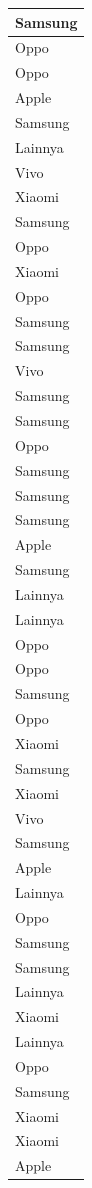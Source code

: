 \documentclass[
  letterpaper,
  DIV=11,
  numbers=noendperiod]{scrartcl}
\begin{document}
\begin{table}
\begin{tabular}[t]{l}
\hline
Samsung\\
\hline
Oppo\\
\hline
Oppo\\
\hline
Apple\\
\hline
Samsung\\
\hline
Lainnya\\
\hline
Vivo\\
\hline
Xiaomi\\
\hline
Samsung\\
\hline
Oppo\\
\hline
Xiaomi\\
\hline
Oppo\\
\hline
Samsung\\
\hline
Samsung\\
\hline
Vivo\\
\hline
Samsung\\
\hline
Samsung\\
\hline
Oppo\\
\hline
Samsung\\
\hline
Samsung\\
\hline
Samsung\\
\hline
Apple\\
\hline
Samsung\\
\hline
Lainnya\\
\hline
Lainnya\\
\hline
Oppo\\
\hline
Oppo\\
\hline
Samsung\\
\hline
Oppo\\
\hline
Xiaomi\\
\hline
Samsung\\
\hline
Xiaomi\\
\hline
Vivo\\
\hline
Samsung\\
\hline
Apple\\
\hline
Lainnya\\
\hline
Oppo\\
\hline
Samsung\\
\hline
Samsung\\
\hline
Lainnya\\
\hline
Xiaomi\\
\hline
Lainnya\\
\hline
Oppo\\
\hline
Samsung\\
\hline
Xiaomi\\
\hline
Xiaomi\\
\hline
Apple\\

\end{tabular}
\end{table}
\end{document}
